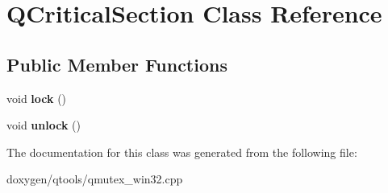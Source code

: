 \hypertarget{class_q_critical_section}{}\section{Q\+Critical\+Section Class Reference}
\label{class_q_critical_section}
\subsection*{Public Member Functions}
\begin{DoxyCompactItemize}
\item 
\mbox{\label{class_q_critical_section_ab48454bdd4d6715733a077c62ae41963}} 
void {\bfseries lock} ()
\item 
\mbox{\label{class_q_critical_section_ab1bc8e8fd0fa1c4501aa021c5011f495}} 
void {\bfseries unlock} ()
\end{DoxyCompactItemize}


The documentation for this class was generated from the following file\+:\begin{DoxyCompactItemize}
\item 
doxygen/qtools/qmutex\+\_\+win32.\+cpp\end{DoxyCompactItemize}

